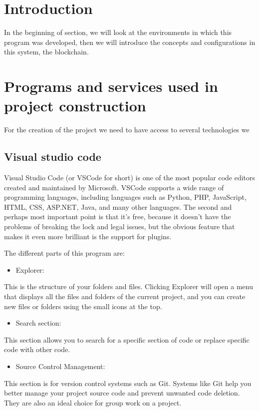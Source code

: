 
\section{Introduction}
In the beginning of section, we will look at the environments in which this program was developed, then we will introduce the concepts and configurations in this system, the blockchain.

\section{Programs and services used in project construction}
For the creation of the project we need to have access to several technologies we 

\subsection{Visual studio code}
Visual Studio Code (or VSCode for short) is one of the most popular code editors created and maintained by Microsoft. VSCode supports a wide range of programming languages, including languages such as Python, PHP, JavaScript, HTML, CSS, ASP.NET, Java, and many other languages. The second and perhaps most important point is that it's free, because it doesn't have the problems of breaking the lock and legal issues, but the obvious feature that makes it even more brilliant is the support for plugins.\textcite{wiki:Visual_Studio_Code}

The different parts of this program are:

\begin{itemize}
\item Explorer:
\end{itemize}

This is the structure of your folders and files. Clicking Explorer will open a menu that displays all the files and folders of the current project, and you can create new files or folders using the small icons at the top.

\begin{itemize}
\item Search section:
\end{itemize}

This section allows you to search for a specific section of code or replace specific code with other code.

\begin{itemize}
\item Source Control Management:
\end{itemize}
This section is for version control systems such as Git. Systems like Git help you better manage your project source code and prevent unwanted code deletion. They are also an ideal choice for group work on a project.

